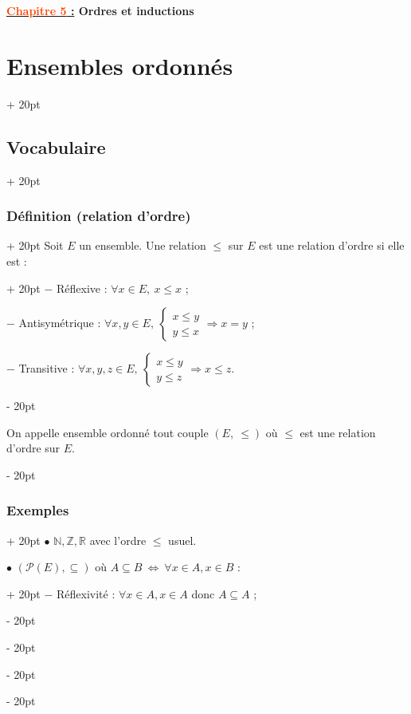 \documentclass[a4paper, 12pt, twoside]{article}
\renewcommand{\emph}{\textcolor{ff4500}}
\newcommand{\N}{\mathbb{N}} %
\newcommand{\Z}{\mathbb{Z}} %
\newcommand{\R}{\mathbb{R}} %
\newcommand{\ssi}{\ \Leftrightarrow \ }
\newcommand{\eqsys}[2]{\begin{cases} #1 \\ #2 \end{cases}}
\renewcommand{\le}{\leqslant}
\newcommand{\ind}[1][20pt]{\advance\leftskip + #1}
\newcommand{\deind}[1][20pt]{\advance\leftskip - #1}
\newenvironment{indt}[2][20pt]{#2 \par \ind[#1]}{\par \deind} %
\newcommand{\thetitle}[2]{\begin{center}\textbf{{\LARGE \underline{\emph{#1} :}} {\Large #2}}\end{center}}
\begin{document}
    \thetitle{Chapitre 5}{Ordres et inductions}
    
    \tableofcontents
    \newpage
    
    
    \begin{indt}{\section{Ensembles ordonnés}}
        
        \begin{indt}{\subsection{Vocabulaire}}
            \begin{indt}{\subsubsection{Définition (relation d'ordre)}}
                \begin{indt}{Soit $E$ un ensemble. Une relation $\le$ sur $E$ est une relation d'ordre si elle est :}                
                    $-$ Réflexive : $\forall x \in E,\ x \le x$ ;
                    
                    $-$ Antisymétrique : $\forall x, y \in E,\ \eqsys{x \le y}{y \le x} \Rightarrow x = y$ ;
                    
                    $-$ Transitive : $\forall x, y, z \in E,\ \eqsys{x \le y}{y \le z} \Rightarrow x \le z$.
                \end{indt}
                
                \vspace{12pt}
                
                On appelle ensemble ordonné tout couple $(E,\ \le)$ où $\le$ est une relation d'ordre sur $E$.
            \end{indt}
            
            \vspace{12pt}
            
            \begin{indt}{\subsubsection{Exemples}}
                $\bullet$ $\N, \Z, \R$ avec l'ordre $\le$ usuel.
                
                \begin{indt}{$\bullet$ $(\mathcal P(E), \subseteq)$ où $A \subseteq B \ssi \forall x \in A, x \in B$ :}
                    $-$ Réflexivité : $\forall x \in A, x \in A$ donc $A \subseteq A$ ;
                    

\end{indt}
\end{indt}
\end{indt}
\end{indt}
\end{document}
